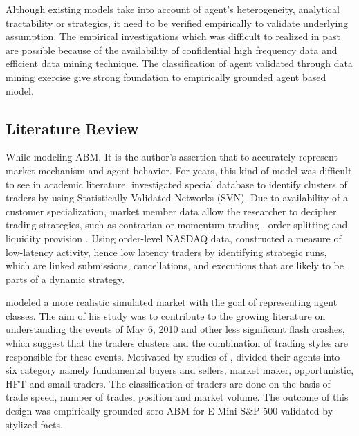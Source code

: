\documentclass[12pt,a4paper]{article}
\numberwithin{equation}{section}
\numberwithin{figure}{section}
\numberwithin{table}{section}
\begin{document}
Although existing models take into account of agent's heterogeneity, analytical tractability or strategics, it need to be verified empirically to validate underlying assumption. The empirical investigations which was difficult to realized in past are possible because of the availability of confidential high frequency data and efficient data mining technique. The classification of agent validated through data mining exercise give strong foundation to empirically grounded agent based model.

\subsection{Literature Review}

While modeling ABM, It is the author's assertion that to accurately represent market mechanism and agent behavior. For years, this kind of model was difficult to see in academic literature. \citet{TumminelloLilloPiiloMantegna2012} investigated special database to identify clusters of traders by using Statistically Validated Networks (SVN). Due to availability of a customer specialization, market member data allow the researcher to decipher trading strategies, such as contrarian or momentum trading \citep{LilloMoroVaglicaMantegna2008}, order splitting \citep{VaglicaLilloMoroMantegna2008, MoroVicenteMoyanoGerigFarmerLilloMantegna2009, RenZhou2011} and liquidity provision \citep{TothEislerLilloKockelkorenBouchaudFarmer2012}. Using order-level NASDAQ data, \citet{hasbrouck2010} constructed a measure of low-latency activity, hence low latency traders by identifying strategic runs, which are linked submissions, cancellations, and executions that are likely to be parts of a dynamic strategy. 

\citet{paddrik2012} modeled a more realistic simulated market with the goal of representing agent classes. The aim of his study was to contribute to the growing literature on understanding the events of May 6, 2010 and other less significant flash crashes, which suggest that the traders clusters and the combination of trading styles are responsible for these events. Motivated by studies of \citet{kirilenko2010}, \citet{paddrik2012} divided their agents into six category namely fundamental buyers and sellers, market maker, opportunistic, HFT and small traders. The classification of traders are done on the basis of trade speed, number of trades, position and market volume. The outcome of this design was empirically grounded zero ABM for E-Mini S\&P 500 validated by stylized facts.
\end{document}
